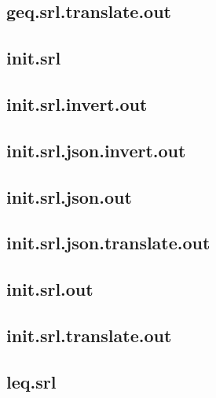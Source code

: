 \subsection{geq.srl.translate.out}
\label{app:geq_srl.translate.out}

\subsection{init.srl}
\label{app:init_srl}

\subsection{init.srl.invert.out}
\label{app:init_srl.invert.out}

\subsection{init.srl.json.invert.out}
\label{app:init_srl.json.invert.out}

\subsection{init.srl.json.out}
\label{app:init_srl.json.out}

\subsection{init.srl.json.translate.out}
\label{app:init_srl.json.translate.out}

\subsection{init.srl.out}
\label{app:init_srl.out}

\subsection{init.srl.translate.out}
\label{app:init_srl.translate.out}

\subsection{leq.srl}
\label{app:leq_srl}

